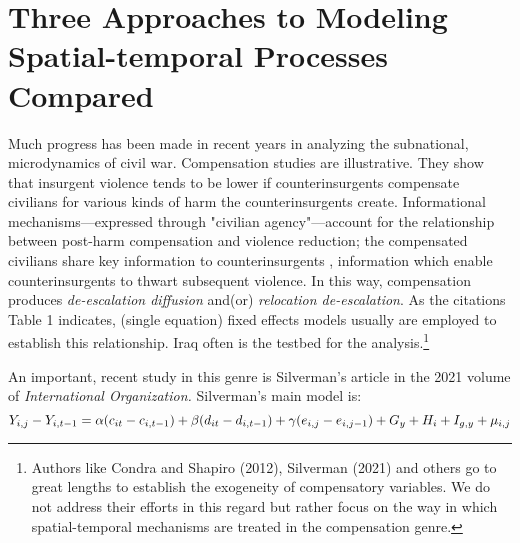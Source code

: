\documentclass[12pt]{article}
\begin{document}
\section{Three Approaches to Modeling Spatial-temporal Processes Compared}
Much progress has been made in recent years in analyzing the subnational,
microdynamics of civil war. Compensation studies are illustrative.
They show that insurgent violence tends to be lower if counterinsurgents compensate
civilians for various kinds of harm the counterinsurgents create. Informational
mechanisms---expressed through "civilian agency"---account for the
relationship between post-harm compensation and violence
reduction; the compensated civilians share key information to counterinsurgents
, information which enable counterinsurgents
to thwart subsequent violence. In this way, compensation produces \emph{de-escalation
diffusion} and(or) \emph{relocation de-escalation}. As the citations Table 1 indicates,
(single equation) fixed effects models usually are
employed to establish this relationship. Iraq often is the testbed for the analysis.\footnote
{Authors like Condra and Shapiro (2012), Silverman (2021) and others go to great lengths to establish
the exogeneity of compensatory variables. We do not address their efforts in this
regard but rather focus on the way in which spatial-temporal mechanisms are treated
in the compensation genre.}

An important, recent study in this genre is Silverman's article in the 2021 volume
of \textit{International Organization.} Silverman's main model is:
\begin{equation}
Y_{i,j}-Y_{i,t-1} = \alpha (c_{it}-c_{i,t-1}) + \beta (d_{it}-d_{i,t-1}) + \gamma( e_{i,j}-e_{i,j-1})\\
 + G_y + H_i + I_{g,y} + \mu_{i,j}
\end{equation}
\end{document}
